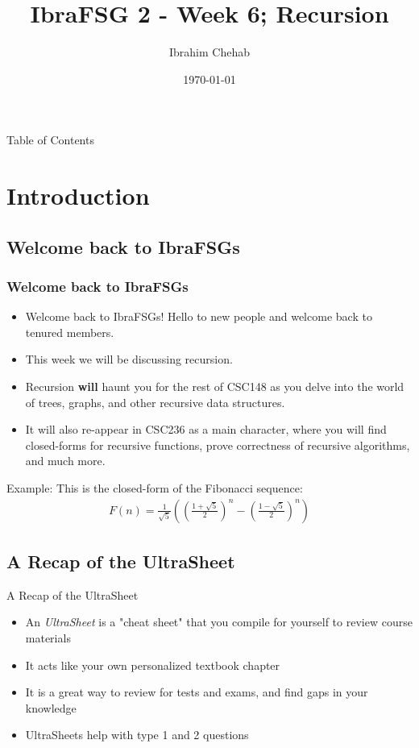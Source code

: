 \documentclass[hyperref={colorlinks,citecolor=blue,linkcolor=blue,urlcolor=blue}]{beamer}
\title[IbraFSG \- Recursion]{IbraFSG\texttrademark{} 2 - Week 6; Recursion}
\author{Ibrahim Chehab}
\institute{UTM RGASC}
\date{\today}
\begin{document}
\begin{frame}
  \titlepage
\end{frame}

\begin{frame}{Table of Contents}
  \tableofcontents
\end{frame}

\section{Introduction}

\subsection{Welcome back to IbraFSGs\texttrademark{}}
\begin{frame}
  \frametitle{Welcome back to IbraFSGs\texttrademark{}}
  \begin{itemize}
  \item Welcome back to IbraFSGs\texttrademark{}! Hello to new people and welcome back to tenured members.
  \item This week we will be discussing recursion.
  \item Recursion \textbf<overlay specification>{will} haunt you for the rest of CSC148 as you delve into the world of trees, graphs, and other recursive data structures. 
 \item It will also re-appear in CSC236 as a main character, where you will find closed-forms for recursive functions, prove correctness of recursive algorithms, and much more.
\end{itemize}

Example: This is the closed-form of the Fibonacci sequence:
\begin{align}
F(n) = \frac{1}{\sqrt{5}}\left(\left(\frac{1+\sqrt{5}}{2}\right)^n - \left(\frac{1-\sqrt{5}}{2}\right)^n\right)
\end{align}

\end{frame}

\subsection{A Recap of the UltraSheet\texttrademark{}}
\begin{frame}{A Recap of the UltraSheet\texttrademark{}}
  \begin{itemize}
    \item An \textit<overlay specification>{UltraSheet\texttrademark{}} is a "cheat sheet" that you compile for yourself to review course materials 
    \item It acts like your own personalized textbook chapter
    \item It is a great way to review for tests and exams, and find gaps in your knowledge
    \item UltraSheets\texttrademark{} help with type 1 and 2 questions 
  \end{itemize}


\end{frame}
\end{document}
